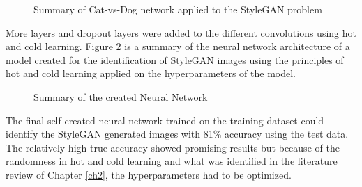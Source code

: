 \begin{figure}[H]%
\centering
{}%
\caption{Summary of Cat-vs-Dog network applied to the StyleGAN problem}%
\label{fig:nn1}%
\end{figure}

More layers and dropout layers were added to the different convolutions using hot and cold learning. Figure \ref{fig:nn2} is a summary of the neural network architecture of a model created for the identification of StyleGAN images using the principles of hot and cold learning applied on the hyperparameters of the model.  

\begin{figure}[H]%
\centering
{}%
\caption{Summary of the created Neural Network}%
\label{fig:nn2}%
\end{figure}

The final self-created neural network trained on the training dataset could identify the StyleGAN generated images with 81\% accuracy using the test data. The relatively high true accuracy showed promising results but because of the randomness in hot and cold learning and what was identified in the literature review of Chapter \ref{ch2}, the hyperparameters had to be optimized.


